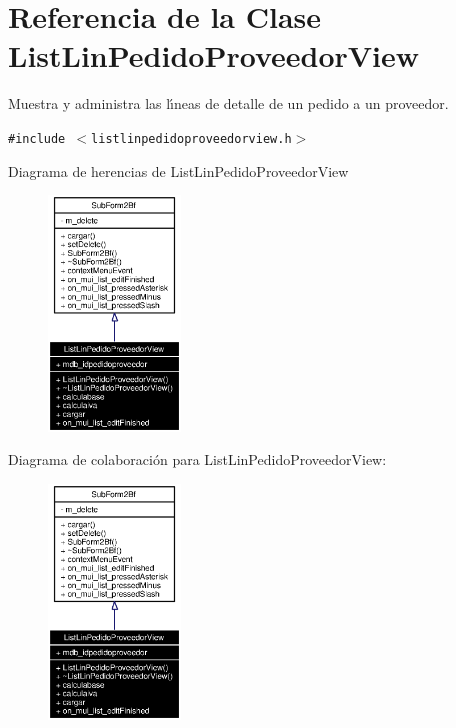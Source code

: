 \section{Referencia de la Clase List\-Lin\-Pedido\-Proveedor\-View}
\label{classListLinPedidoProveedorView}
Muestra y administra las l\'{\i}neas de detalle de un pedido a un proveedor.  


{\tt \#include $<$listlinpedidoproveedorview.h$>$}

Diagrama de herencias de List\-Lin\-Pedido\-Proveedor\-View\begin{figure}[H]
\begin{center}
\leavevmode
\includegraphics[width=100pt]{classListLinPedidoProveedorView__inherit__graph}
\end{center}
\end{figure}
Diagrama de colaboraci\'{o}n para List\-Lin\-Pedido\-Proveedor\-View:\begin{figure}[H]
\begin{center}
\leavevmode
\includegraphics[width=100pt]{classListLinPedidoProveedorView__coll__graph}
\end{center}
\end{figure}
